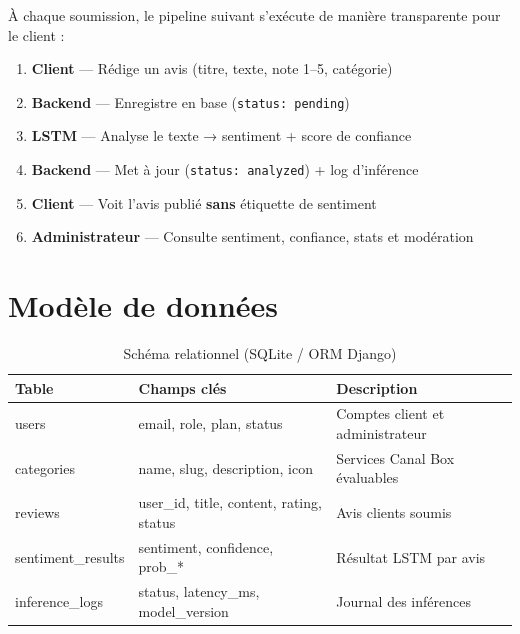 \documentclass[11pt,a4paper]{article}
\begin{document}
À chaque soumission, le pipeline suivant s'exécute de manière transparente pour le client :

\begin{enumerate}[leftmargin=*, itemsep=6pt]
  \item[\tikz{\node[circle, fill=cbPink, text=white, font=\bfseries\small, minimum size=6mm]{1};}]
    \textbf{Client} — Rédige un avis (titre, texte, note 1–5, catégorie)
  \item[\tikz{\node[circle, fill=cbSlate, text=white, font=\bfseries\small, minimum size=6mm]{2};}]
    \textbf{Backend} — Enregistre en base (\texttt{status: pending})
  \item[\tikz{\node[circle, fill=cbPos, text=white, font=\bfseries\small, minimum size=6mm]{3};}]
    \textbf{LSTM} — Analyse le texte → sentiment + score de confiance
  \item[\tikz{\node[circle, fill=cbSlate, text=white, font=\bfseries\small, minimum size=6mm]{4};}]
    \textbf{Backend} — Met à jour (\texttt{status: analyzed}) + log d'inférence
  \item[\tikz{\node[circle, fill=cbPinkSoft, draw=cbPink, text=cbPink, font=\bfseries\small, minimum size=6mm]{5};}]
    \textbf{Client} — Voit l'avis publié \textbf{sans} étiquette de sentiment
  \item[\tikz{\node[circle, fill=cbDark, text=white, font=\bfseries\small, minimum size=6mm]{6};}]
    \textbf{Administrateur} — Consulte sentiment, confiance, stats et modération
\end{enumerate}

\newpage

\section{Modèle de données}

\begin{table}[h]
  \centering
  \renewcommand{\arraystretch}{1.4}
  \begin{tabularx}{\textwidth}{>{\ttfamily\small}l >{\ttfamily\small}l X}
    \toprule
    \rowcolor{cbPinkDark}\color{white}\bfseries Table & \color{white}\bfseries Champs clés & \color{white}\bfseries Description \\
    \midrule
    users & email, role, plan, status & Comptes client et administrateur \\
    categories & name, slug, description, icon & Services Canal Box évaluables \\
    reviews & user\_id, title, content, rating, status & Avis clients soumis \\
    sentiment\_results & sentiment, confidence, prob\_* & Résultat LSTM par avis \\
    inference\_logs & status, latency\_ms, model\_version & Journal des inférences \\
    \bottomrule
  \end{tabularx}
  \caption{Schéma relationnel (SQLite / ORM Django)}
\end{table}
\end{document}
